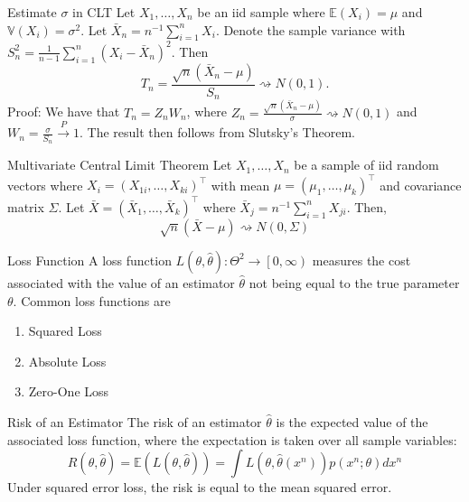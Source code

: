 \documentclass[avery5371,grid]{flashcards}
\begin{document}
\begin{flashcard}[Theorem]{Estimate $\sigma$ in CLT}
Let $X_1, \ldots, X_n$ be an iid sample where $\mathbb E (X_i) = \mu$ and $\mathbb V (X_i) = \sigma^2$. Let $\bar X_n = n^{-1} \sum_{i=1}^n X_i$. Denote the sample variance with
$S_n^2 = \frac{1}{n-1} \sum_{i=1}^n \left( X_i - \bar X_n \right)^2$. Then 
\[
T_n = \frac{\sqrt{n}\left(\bar X_n -\mu \right)}{S_n} \rightsquigarrow N(0,1).
\]
Proof:  We have that $T_n = Z_nW_n$, where $Z_n = \frac{\sqrt{n}\left(\bar X_n -\mu \right)}{\sigma} \rightsquigarrow N(0,1)$ and $W_n = \frac{\sigma}{S_n} \overset{P} \to 1$. The result
then follows from Slutsky's Theorem.
\end{flashcard}

\begin{flashcard}[Theorem]{Multivariate Central Limit Theorem}
Let $X_1,\ldots,X_n$ be a sample of iid random vectors where $X_i = \left( X_{1i} , \ldots, X_{ki} \right)^\intercal$ with mean $\mu = \left( \mu_1, \ldots, \mu_k \right)^\intercal$ 
and covariance matrix $\Sigma$. Let $\bar X = \left( \bar X_1 , \ldots, \bar X_k \right)^\intercal$ where $\bar X_j = n^{-1} \sum_{i=1}^n X_{ji}$. Then,
\[
\sqrt{n} \left(\bar X - \mu \right) \rightsquigarrow N(0,\Sigma)
\]
\end{flashcard}

\begin{flashcard}[Definition]{Loss Function}
A loss function $L\left(\theta, \hat \theta \right) : \Theta^2 \to \left[0,\infty\right)$ measures the cost associated with the value of an 
estimator $\hat \theta$ not being equal to the true parameter $\theta$. Common loss functions are 
\begin{enumerate}
 \item Squared Loss
 \item Absolute Loss
 \item Zero-One Loss
\end{enumerate}

\end{flashcard}

\begin{flashcard}[Definition]{Risk of an Estimator}
 The risk of an estimator $\hat \theta$ is the expected value of the associated loss function,
 where the expectation is taken over all sample variables:
 \[
 R\left( \theta, \hat \theta \right) = \mathbb E \left( L\left(\theta, \hat \theta \right) \right)
 = \int L\left(\theta, \hat \theta\left(x^n\right) \right) p(x^n;\theta) dx^n
 \]
 Under squared error loss, the risk is equal to the mean squared error.
\end{flashcard}
\end{document}
